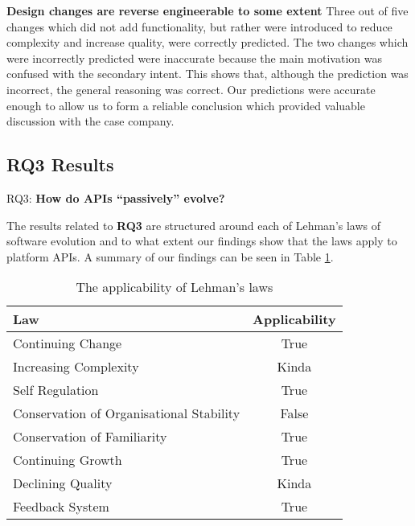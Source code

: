 \documentclass{sig-alternate}
\begin{document}
\smallskip \noindent
\textbf{Design changes are reverse engineerable to some extent  }  %
Three out of five changes which did not add functionality, but rather were introduced to reduce complexity and increase quality, were correctly predicted. The two changes which were incorrectly predicted were inaccurate because the main motivation was confused with the secondary intent. This shows that, although the prediction was incorrect, the general reasoning was correct. Our predictions were accurate enough to allow us to form a reliable conclusion which provided valuable discussion with the case company. 


\subsection{RQ3 Results} \label{results_RQ3} 
\noindent
RQ3: \textbf{How do APIs ``passively'' evolve?}
\smallskip

The results related to \textbf{RQ3} are structured around each of Lehman's laws of software evolution \cite{lehman1980programs} and to what extent our findings show that the laws apply to platform APIs. A summary of our findings can be seen in Table \ref{table:lehman}. 


\begin{table}
       \centering
       \begin{tabular}[ht]{l|c}
              \toprule

              \textbf{Law}                              & \textbf{Applicability}    \\ \midrule
              Continuing Change                         & True                      \\ \hline
              Increasing Complexity                     & Kinda                     \\ \hline
              Self Regulation                           & True                      \\ \hline
              Conservation of Organisational Stability  & False                     \\ \hline
              Conservation of Familiarity               & True                      \\ \hline
              Continuing Growth                         & True                      \\ \hline
              Declining Quality                         & Kinda                     \\ \hline
              Feedback System                           & True                      \\ 

              \bottomrule

       \end{tabular}
       \caption{The applicability of Lehman's laws}
       \label{table:lehman}
\end{table}
\end{document}
